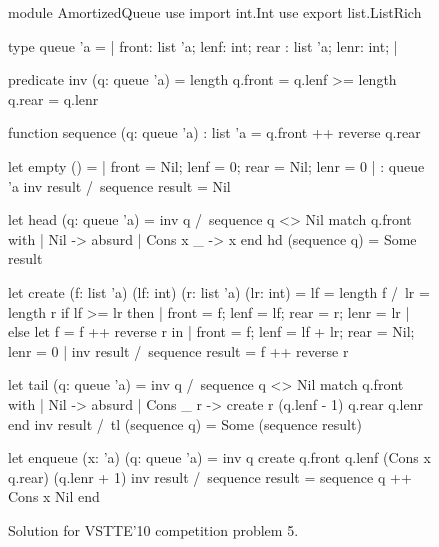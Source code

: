 \begin{figure}
  \centering
\begin{whycode}
module AmortizedQueue
  use import int.Int
  use export list.ListRich

  type queue 'a = {| front: list 'a; lenf: int;
                     rear : list 'a; lenr: int; |}

  predicate inv (q: queue 'a) =
    length q.front = q.lenf >= length q.rear = q.lenr

  function sequence (q: queue 'a) : list 'a = q.front ++ reverse q.rear

  let empty () =
    {}
    {| front = Nil; lenf = 0; rear = Nil; lenr = 0 |} : queue 'a
    { inv result /\ sequence result = Nil }

  let head (q: queue 'a) =
    { inv q /\ sequence q <> Nil }
    match q.front with
      | Nil      -> absurd
      | Cons x _ -> x
    end
    { hd (sequence q) = Some result }

  let create (f: list 'a) (lf: int) (r: list 'a) (lr: int) =
    { lf = length f /\ lr = length r }
    if lf >= lr then
      {| front = f; lenf = lf; rear = r; lenr = lr |}
    else
      let f = f ++ reverse r in
      {| front = f; lenf = lf + lr; rear = Nil; lenr = 0 |}
    { inv result /\ sequence result = f ++ reverse r }

  let tail (q: queue 'a) =
    { inv q /\ sequence q <> Nil }
    match q.front with
      | Nil      -> absurd
      | Cons _ r -> create r (q.lenf - 1) q.rear q.lenr
    end
    { inv result /\ tl (sequence q) = Some (sequence result) }

  let enqueue (x: 'a) (q: queue 'a) =
    { inv q }
    create q.front q.lenf (Cons x q.rear) (q.lenr + 1)
    { inv result /\ sequence result = sequence q ++ Cons x Nil }
end
\end{whycode}
\vspace*{-2em}\hrulefill
  \caption{Solution for VSTTE'10 competition problem 5.}
  \label{fig:AQueue}
\end{figure}



